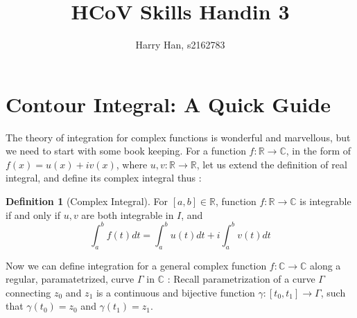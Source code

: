 \documentclass[a4paper,11pt]{article}
\title{HCoV Skills Handin 3}
\author{Harry Han, s2162783}
\theoremstyle{definition}
\newtheorem{defn}[prop]{Definition}
\newcommand{\bb}[1]{\mathbb{#1}}
\begin{document}
\maketitle

\section{Contour Integral: A Quick Guide}



The theory of integration for complex functions is wonderful and marvellous, but we need to start with some book keeping.
For a function $f: \bb{R} \rightarrow \bb{C}$, in the form of $f(x) = u(x) +  iv(x)$,
where $u,v : \bb{R} \rightarrow  \bb{R}$, let us extend the definition of real integral,
and define its complex integral thus \cite{gratwick_2023_HCoV}:

\begin{defn}[Complex Integral]
	For $ [a, b] \in \bb{R}$, function $f : \bb{R} \rightarrow \bb{C}$ is integrable
	if and only if $u ,v$ are both integrable in $I$, and
	\begin{equation}
		\int_a^b f(t)dt = \int_a^b u(t)dt + i \int_a^b v(t)dt
	\end{equation}
\end{defn}

Now we can define integration for a general complex function $f: \bb{C} \rightarrow  \bb{C}$ along a regular, paramatetrized, curve $\Gamma$ in $\bb{C}$ \cite{gratwick_2023_HCoV}:
Recall parametrization of a curve $\Gamma$ connecting $z_0$ and $ z_1$ is a continuous and bijective function $\gamma: [t_0, t_1] \rightarrow \Gamma $, such that $\gamma(t_0) = z_0$ and $\gamma(t_1) = z_1$.
\end{document}
